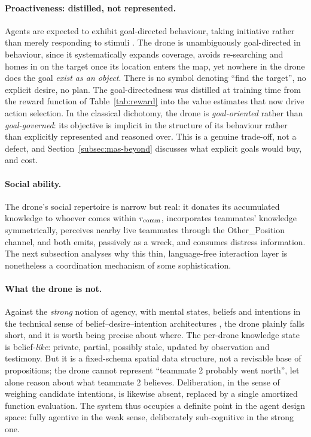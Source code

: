 \paragraph{Proactiveness: distilled, not represented.}
Agents are expected to exhibit goal-directed behaviour, taking initiative rather
than merely responding to stimuli \citep{wooldridge1995intelligent}. The drone is
unambiguously goal-directed in behaviour, since it systematically expands
coverage, avoids re-searching and homes in on the target once its location enters
the map, yet nowhere in the drone does the goal \emph{exist as an object}. There
is no symbol denoting ``find the target'', no explicit desire, no plan. The
goal-directedness was distilled at training time from the reward function of
Table~\ref{tab:reward} into the value estimates that now drive action selection.
In the classical dichotomy, the drone is \emph{goal-oriented} rather than
\emph{goal-governed}: its objective is implicit in the structure of its behaviour
rather than explicitly represented and reasoned over. This is a genuine
trade-off, not a defect, and Section~\ref{subsec:mas-beyond} discusses what
explicit goals would buy, and cost.

\paragraph{Social ability.}
The drone's social repertoire is narrow but real: it donates its accumulated
knowledge to whoever comes within $r_{\mathrm{comm}}$, incorporates teammates' knowledge
symmetrically, perceives nearby live teammates through the Other\_Position
channel, and both emits, passively as a wreck, and consumes distress information.
The next subsection analyses why this thin, language-free interaction layer is
nonetheless a coordination mechanism of some sophistication.

\paragraph{What the drone is not.}
Against the \emph{strong} notion of agency, with mental states, beliefs and
intentions in the technical sense of belief--desire--intention architectures
\citep{rao1995bdi,bratman1987intention}, the drone plainly falls short, and it is
worth being precise about where. The per-drone knowledge state is
belief-\emph{like}: private, partial, possibly stale, updated by observation and
testimony. But it is a fixed-schema spatial data structure, not a revisable base
of propositions; the drone cannot represent ``teammate 2 probably went north'',
let alone reason about what teammate 2 believes. Deliberation, in the sense of
weighing candidate intentions, is likewise absent, replaced by a single amortized
function evaluation. The system thus occupies a definite point in the agent
design space: fully agentive in the weak sense, deliberately sub-cognitive in the
strong one.

